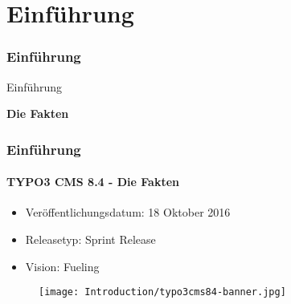 %

\section{Einführung}
\begin{frame}[fragile]
	\frametitle{Einführung}

	\begin{center}\huge{Einführung}\end{center}
	\begin{center}\huge{\color{typo3darkgrey}\textbf{Die Fakten}}\end{center}

\end{frame}

\begin{frame}[fragile]
	\frametitle{Einführung}
	\framesubtitle{TYPO3 CMS 8.4 - Die Fakten}

	\begin{itemize}
		\item Veröffentlichungsdatum: 18 Oktober 2016
		\item Releasetyp: Sprint Release
		\item Vision: Fueling
	\end{itemize}

	\begin{figure}
		\texttt{[image: Introduction/typo3cms84-banner.jpg]}
	\end{figure}

\end{frame}

